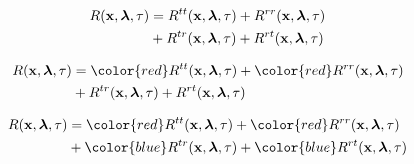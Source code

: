 \begin{frame} 
\begin{align}
\nonumber R({\bf x},{\boldsymbol{\lambda}},\tau) &= R^{tt}({\bf x},{\boldsymbol{\lambda}},\tau) +R^{rr}({\bf x},{\boldsymbol{\lambda}},\tau)\\
\nonumber             &+ R^{tr}({\bf x},{\boldsymbol{\lambda}},\tau)+ R^{rt}({\bf x},{\boldsymbol{\lambda}},\tau)
\end{align}
\end{frame}


\begin{frame} 
\begin{align}
\nonumber \Re &= {\color{red} \Rce{tt}} + {\color{red} \Rce{rr}}\\
\nonumber             &+ \Rce{tr}+ \Rce{rt}
\end{align}
\end{frame}

\begin{frame} 
\begin{align}
\nonumber \Re &= {\color{red} \Rce{tt}} + {\color{red} \Rce{rr}}\\
\nonumber             &+ {\color{blue} \Rce{tr} }+ {\color{blue} \Rce{rt}}
\end{align}
\end{frame}





\begin{frame}
\end{frame}
\linethickness{0.2mm}




\begin{frame}
\begin{columns}



\end{columns}
\end{frame}


\begin{frame}
\end{frame}


